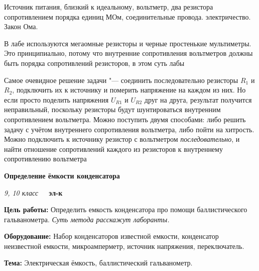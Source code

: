 \documentclass[a4paper,10pt]{article}
\newcommand{\labtitle}[7]{
	\textbf{#2}\par
	\textit{#1 класс}~~~\textbf{#3}\par
	\textbf{Цель работы:} #4\par
	\textbf{Оборудование:} #5\par
	\textbf{Тема:} #6
}
\begin{document}
\begin{enumerate}
		{Источник питания, близкий к идеальному, вольтметр, два резистора сопротивлением порядка единиц МОм, соединительные провода.}
		{электричество. Закон Ома.}
		{\item В лабе используются мегаомные резисторы и черные простенькие мультиметры. Это принципиально, потому что внутренние сопротивления вольтметров должны быть порядка сопротивлений резисторов, в этом суть лабы
        \item Самое очевидное решение задачи "--- соединить последовательно резисторы $R_1$ и $R_2$, подключить их к источнику и померить напряжение на каждом из них. Но если просто поделить напряжения $U_{R1}$ и $U_{R2}$ друг на друга, результат получится неправильный, поскольку резисторы будут шунтироваться внутренним сопротивлением вольтметра. Можно поступить двумя способами: либо решить задачу с учётом внутреннего сопротивления вольтметра, либо пойти на хитрость. Можно подключить к источнику резистор с вольтметром \textit{последовательно}, и найти отношение сопротивлений каждого из резисторов к внутреннему сопротивлению вольтметра}
	\item \labtitle
		{9, 10}
		{Определение ёмкости конденсатора}
		{эл-к}
		{Определить емкость конденсатора про помощи баллистического гальванометра. \textit{Суть метода расскажут лаборанты.}}
		{Набор конденсаторов известной емкости, конденсатор неизвестной емкости, микроамперметр, источник напряжения, переключатель.}
		{Электрическая ёмкость, баллистический гальванометр.}
		{\item Разбираемся, что такое электрическая ёмкость и конденсатор. Можно рассказать, как конденсатор заряжается от источника через резистор и как разряжается через резистор. Нарисовать графики напряжения от времени. Это поможет привыкнуть к концепции конденсатора

}
\end{enumerate}
\end{document}
